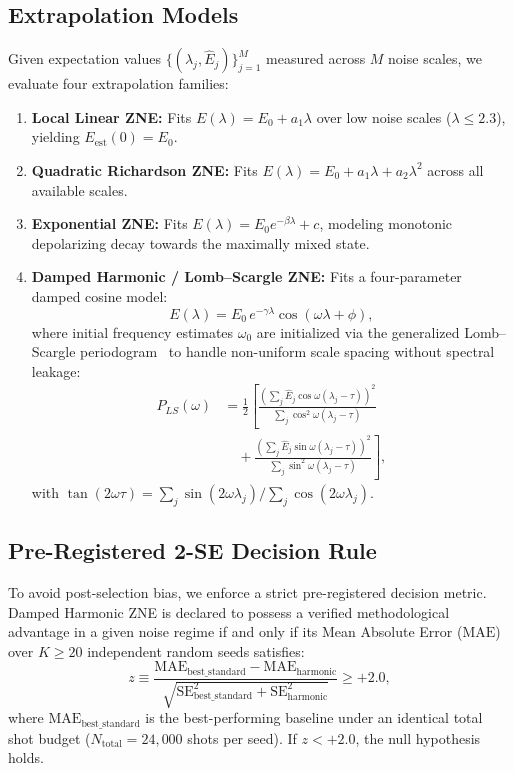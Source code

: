 \documentclass[10pt,twocolumn,a4paper]{article}
\begin{document}
\subsection{Extrapolation Models}
Given expectation values $\{(\lambda_j, \hat{E}_j)\}_{j=1}^M$ measured across $M$ noise scales, we evaluate four extrapolation families:
\begin{enumerate}
    \item \textbf{Local Linear ZNE:} Fits $E(\lambda) = E_0 + a_1 \lambda$ over low noise scales ($\lambda \le 2.3$), yielding $E_{\mathrm{est}}(0) = E_0$.
    \item \textbf{Quadratic Richardson ZNE:} Fits $E(\lambda) = E_0 + a_1 \lambda + a_2 \lambda^2$ across all available scales.
    \item \textbf{Exponential ZNE:} Fits $E(\lambda) = E_0 e^{-\beta \lambda} + c$, modeling monotonic depolarizing decay towards the maximally mixed state.
    \item \textbf{Damped Harmonic / Lomb--Scargle ZNE:} Fits a four-parameter damped cosine model:
    \begin{equation}
    E(\lambda) = E_0 \, e^{-\gamma \lambda} \cos(\omega \lambda + \phi),
    \label{eq:harmonic_model}
    \end{equation}
    where initial frequency estimates $\omega_0$ are initialized via the generalized Lomb--Scargle periodogram~\cite{scargle1982} to handle non-uniform scale spacing without spectral leakage:
    \begin{align}
    P_{LS}(\omega) &= \frac{1}{2}\left[ \frac{\left(\sum_j \hat{E}_j \cos\omega(\lambda_j - \tau)\right)^2}{\sum_j \cos^2\omega(\lambda_j - \tau)} \right. \nonumber \\
    &\quad + \left. \frac{\left(\sum_j \hat{E}_j \sin\omega(\lambda_j - \tau)\right)^2}{\sum_j \sin^2\omega(\lambda_j - \tau)} \right],
    \end{align}
    with $\tan(2\omega\tau) = \sum_j \sin(2\omega\lambda_j) / \sum_j \cos(2\omega\lambda_j)$.
\end{enumerate}

\subsection{Pre-Registered 2-SE Decision Rule}
To avoid post-selection bias, we enforce a strict pre-registered decision metric. Damped Harmonic ZNE is declared to possess a verified methodological advantage in a given noise regime if and only if its Mean Absolute Error ($\mathrm{MAE}$) over $K \ge 20$ independent random seeds satisfies:
\begin{equation}
z \equiv \frac{\mathrm{MAE}_{\mathrm{best\_standard}} - \mathrm{MAE}_{\mathrm{harmonic}}}{\sqrt{\mathrm{SE}^2_{\mathrm{best\_standard}} + \mathrm{SE}^2_{\mathrm{harmonic}}}} \ge +2.0,
\label{eq:decision_rule}
\end{equation}
where $\mathrm{MAE}_{\mathrm{best\_standard}}$ is the best-performing baseline under an identical total shot budget ($N_{\mathrm{total}} = 24{,}000$ shots per seed). If $z < +2.0$, the null hypothesis holds.
\end{document}
